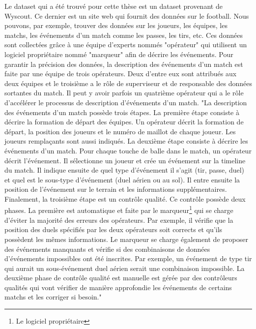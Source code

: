\documentclass[12pt]{article}
\begin{document}
Le dataset qui a été trouvé pour cette thèse est un dataset provenant de Wyscout. 
Ce dernier est un site web qui fournit des données sur le football. 
Nous pouvons, par exemple, trouver des données sur les joueurs, les équipes, les matchs, les événements d'un match comme les passes, les tirs, etc.
Ces données sont collectées grâce à une équipe d'experts nommés "opérateur" qui utilisent un logiciel propriétaire nommé "marqueur" afin de décrire les événements.
Pour garantir la précision des données, la description des événements d'un match est faite par une équipe de trois opérateurs. 
Deux d'entre eux sont attribués aux deux équipes et le troisième a le rôle de superviseur et de responsable des données sortantes du match. \cite{pappalardoPublicDataSet2019} 
Il peut y avoir parfois un quatrième opérateur qui a le rôle d'accélérer le processus de description d'événements d'un match. 
\newline\newline
"La description des événements d'un match possède trois étapes.
La première étape consiste à décrire la formation de départ des équipes. 
Un opérateur décrit la formation de départ, la position des joueurs et le numéro de maillot de chaque joueur. Les joueurs remplaçants sont aussi indiqués. 
La deuxième étape consiste à décrire les événements d'un match.
Pour chaque touche de balle dans le match, un opérateur décrit l'événement. 
Il sélectionne un joueur et crée un événement sur la timeline du match.
Il indique ensuite de quel type d'événement il s'agit (tir, passe, duel) et quel est le sous-type d'événement (duel aérien ou au sol).
Il entre ensuite la position de l'événement sur le terrain et les informations supplémentaires.
Finalement, la troisième étape est un contrôle qualité.
Ce contrôle possède deux phases. 
La première est automatique et faite par le marqueur\footnote{Le logiciel propriétaire} qui se charge d'éviter la majorité des erreurs des opérateurs.
Par exemple, il vérifie que la position des duels spécifiés par les deux opérateurs soit corrects et qu'ils possèdent les mêmes informations.
Le marqueur se charge également de proposer des événements manquants et vérifie si des combinaisons de données d'événements impossibles ont été inscrites.
Par exemple, un événement de type tir qui aurait un sous-événement duel aérien serait une combinaison impossible.
La deuxième phase de contrôle qualité est manuelle est gérée par des contrôleurs qualités qui vont vérifier de manière approfondie les événements de certains matchs et les corriger si besoin." \cite{pappalardoPublicDataSet2019}
\end{document}
